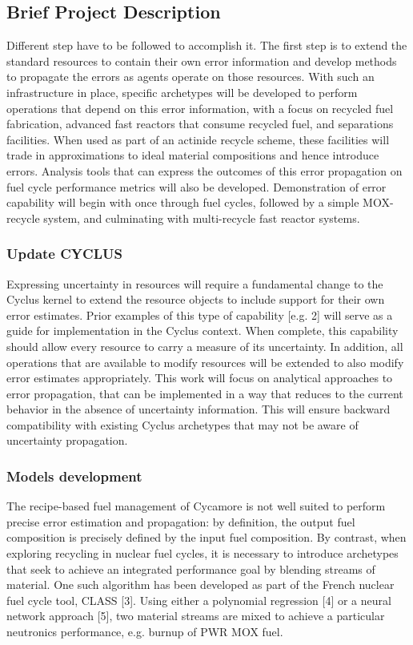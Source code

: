 \documentclass[dvips,12pt]{article}
\begin{document}
\subsection{Brief Project Description}
Different step have to be followed to accomplish it.
The first step is to extend the standard resources to contain their own error information and develop methods to propagate the errors as agents operate on those resources. With such an infrastructure in place, specific archetypes will be developed to perform operations that depend on this error information, with a focus on recycled fuel fabrication, advanced fast reactors that consume recycled fuel, and separations facilities. 
When used as part of an actinide recycle scheme, these facilities will trade in approximations to ideal material compositions and hence introduce errors. 
Analysis tools that can express the outcomes of this error propagation on fuel cycle performance metrics will also be developed. Demonstration of error capability will begin with once through fuel cycles, followed by a simple MOX-recycle system, and culminating with multi-recycle fast reactor systems.

\subsubsection{Update CYCLUS}%
Expressing uncertainty in resources will require a fundamental change to the Cyclus kernel to extend the resource objects to include support for their own error estimates.  Prior examples of this type of capability [e.g. 2] will serve as a guide for implementation in the Cyclus context.  When complete, this capability should allow every resource to carry a measure of its uncertainty.  In addition, all operations that are available to modify resources will be extended to also modify error estimates appropriately. This work will focus on analytical approaches to error propagation,  that can be implemented in a way that reduces to the current behavior in the absence of uncertainty information. This will ensure backward compatibility with existing Cyclus archetypes that may not be aware of uncertainty propagation.

\subsubsection{Models development}
The recipe-based fuel management of Cycamore is not well suited to perform precise error estimation and propagation: by definition, the output fuel composition is precisely defined by the input fuel composition.   By contrast, when exploring recycling in nuclear fuel cycles, it is necessary to introduce archetypes that seek to achieve an integrated performance goal by blending streams of material.  One such algorithm has been developed as part of the French nuclear fuel cycle tool, CLASS [3].  Using either a polynomial regression [4] or a neural network approach [5], two material streams are mixed to achieve a particular neutronics performance, e.g. burnup of PWR MOX fuel.
	
\end{document}
